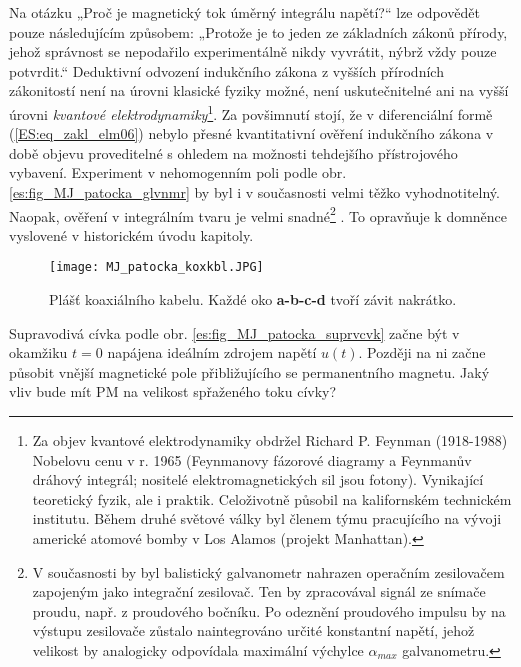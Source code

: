     Na otázku „Proč je magnetický tok úměrný integrálu napětí?“ lze odpovědět pouze následujícím
    způsobem: „Protože je to jeden ze základních zákonů přírody, jehož správnost se nepodařilo
    experimentálně nikdy vyvrátit, nýbrž vždy pouze potvrdit.“ Deduktivní odvození indukčního
    zákona z vyšších přírodních zákonitostí není na úrovni klasické fyziky možné, není
    uskutečnitelné ani na vyšší úrovni \emph{kvantové elektrodynamiky}\footnote{Za objev kvantové
    elektrodynamiky obdržel Richard P. Feynman (1918-1988) Nobelovu cenu v r. 1965 (Feynmanovy
    fázorové diagramy a Feynmanův dráhový integrál; nositelé elektromagnetických sil jsou fotony). 
    Vynikající teoretický fyzik, ale i praktik. Celoživotně působil na kalifornském technickém
    institutu. Během druhé světové války byl členem týmu pracujícího na vývoji americké atomové
    bomby v Los Alamos (projekt Manhattan).}. Za povšimnutí stojí, že v diferenciální formě
    (\ref{ES:eq_zakl_elm06}) nebylo přesné kvantitativní ověření indukčního zákona v době objevu
    proveditelné s ohledem na možnosti tehdejšího přístrojového vybavení. Experiment v nehomogenním
    poli podle obr. \ref{es:fig_MJ_patocka_glvnmr} by byl i v současnosti velmi těžko   
    vyhodnotitelný. Naopak, ověření v integrálním tvaru je velmi snadné\footnote{V současnosti by
    byl balistický galvanometr nahrazen operačním zesilovačem zapojeným jako integrační zesilovač.
    Ten by zpracovával signál ze snímače proudu, např. z proudového bočníku. Po odeznění proudového
    impulsu by na výstupu zesilovače zůstalo naintegrováno určité konstantní napětí, jehož velikost
    by analogicky odpovídala maximální výchylce \(\alpha_{max}\) galvanometru.} . To opravňuje k
    domněnce vyslovené v historickém úvodu kapitoly.
    
    \begin{figure}[ht!]
      \centering
      \texttt{[image: MJ\_patocka\_koxkbl.JPG]}
      \caption[Plášť koaxiálního kabelu.]{Plášť koaxiálního kabelu. Každé oko \textbf{a-b-c-d} tvoří
               závit nakrátko.}
      \label{es:fig_MJ_patocka_koxkbl}
    \end{figure} 
      
      Supravodivá cívka podle obr. \ref{es:fig_MJ_patocka_suprvcvk} začne být v okamžiku \(t = 0\)
      napájena ideálním zdrojem napětí \(u(t)\). Později na ni začne působit vnější magnetické pole
      přibližujícího se permanentního magnetu. Jaký vliv bude mít PM na velikost spřaženého toku
      cívky?
      
